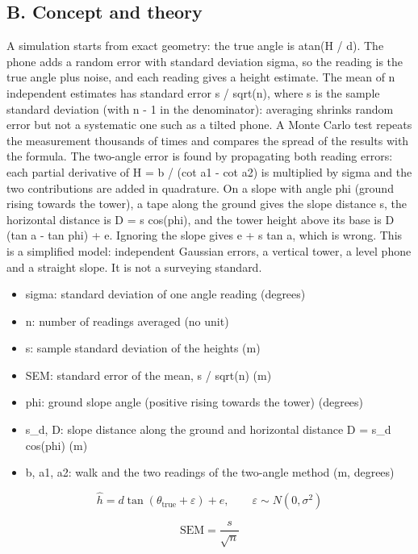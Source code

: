 \documentclass[11pt,a4paper]{article}
\begin{document}
\subsection*{B. Concept and theory}
A simulation starts from exact geometry: the true angle is atan(H / d). The phone adds a random error with standard deviation sigma, so the reading is the true angle plus noise, and each reading gives a height estimate. The mean of n independent estimates has standard error s / sqrt(n), where s is the sample standard deviation (with n - 1 in the denominator): averaging shrinks random error but not a systematic one such as a tilted phone. A Monte Carlo test repeats the measurement thousands of times and compares the spread of the results with the formula. The two-angle error is found by propagating both reading errors: each partial derivative of H = b / (cot a1 - cot a2) is multiplied by sigma and the two contributions are added in quadrature. On a slope with angle phi (ground rising towards the tower), a tape along the ground gives the slope distance s, the horizontal distance is D = s cos(phi), and the tower height above its base is D (tan a - tan phi) + e. Ignoring the slope gives e + s tan a, which is wrong. This is a simplified model: independent Gaussian errors, a vertical tower, a level phone and a straight slope. It is not a surveying standard.

\begin{itemize}[nosep]
\item sigma: standard deviation of one angle reading (degrees)
\item n: number of readings averaged (no unit)
\item s: sample standard deviation of the heights (m)
\item SEM: standard error of the mean, s / sqrt(n) (m)
\item phi: ground slope angle (positive rising towards the tower) (degrees)
\item s\_d, D: slope distance along the ground and horizontal distance D = s\_d cos(phi) (m)
\item b, a1, a2: walk and the two readings of the two-angle method (m, degrees)
\end{itemize}

\begin{equation*}
\hat h=d\tan(\theta_{\mathrm{true}}+\varepsilon)+e,\qquad \varepsilon\sim N(0,\sigma^2)
\end{equation*}

\begin{equation*}
\mathrm{SEM}=\frac{s}{\sqrt n}
\end{equation*}
\end{document}
